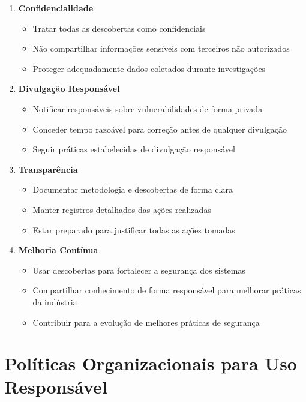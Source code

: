\documentclass[12pt,a4paper]{book}
\begin{document}
\begin{mdframed}[backgroundcolor=roxoconhecimento!10, roundcorner=10pt, leftmargin=1cm, rightmargin=1cm]
\begin{enumerate}
    \item \textbf{Confidencialidade}
    \begin{itemize}
        \item Tratar todas as descobertas como confidenciais
        \item Não compartilhar informações sensíveis com terceiros não autorizados
        \item Proteger adequadamente dados coletados durante investigações
    \end{itemize}
    
    \item \textbf{Divulgação Responsável}
    \begin{itemize}
        \item Notificar responsáveis sobre vulnerabilidades de forma privada
        \item Conceder tempo razoável para correção antes de qualquer divulgação
        \item Seguir práticas estabelecidas de divulgação responsável
    \end{itemize}
    
    \item \textbf{Transparência}
    \begin{itemize}
        \item Documentar metodologia e descobertas de forma clara
        \item Manter registros detalhados das ações realizadas
        \item Estar preparado para justificar todas as ações tomadas
    \end{itemize}
    
    \item \textbf{Melhoria Contínua}
    \begin{itemize}
        \item Usar descobertas para fortalecer a segurança dos sistemas
        \item Compartilhar conhecimento de forma responsável para melhorar práticas da indústria
        \item Contribuir para a evolução de melhores práticas de segurança
    \end{itemize}
\end{enumerate}
\end{mdframed}

\section{Políticas Organizacionais para Uso Responsável}
\end{document}
